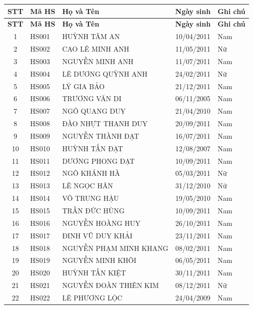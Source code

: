 \begin{longtable}{|c|l|p{6cm}|c|l|}
\hline
\textbf{STT} & \textbf{Mã HS} & \textbf{Họ và Tên} & \textbf{Ngày sinh} & \textbf{Ghi chú} \\
\hline
\endfirsthead
\hline
\textbf{STT} & \textbf{Mã HS} & \textbf{Họ và Tên} & \textbf{Ngày sinh} & \textbf{Ghi chú} \\
\hline
\endhead
1 & HS001 & HUỲNH TÂM AN & 10/04/2011 & Nam \\
\hline
2 & HS002 & CAO LÊ MINH ANH & 11/05/2011 & Nữ \\
\hline
3 & HS003 & NGUYỄN MINH ANH & 11/07/2011 & Nam \\
\hline
4 & HS004 & LÊ DƯƠNG QUỲNH ANH & 24/02/2011 & Nữ \\
\hline
5 & HS005 & LÝ GIA BẢO & 21/12/2011 & Nam \\
\hline
6 & HS006 & TRƯƠNG VĂN DI & 06/11/2005 & Nam \\
\hline
7 & HS007 & NGÔ QUANG DUY & 21/04/2010 & Nam \\
\hline
8 & HS008 & ĐÀO NHỰT THANH DUY & 20/09/2011 & Nam \\
\hline
9 & HS009 & NGUYỄN THÀNH ĐẠT & 16/07/2011 & Nam \\
\hline
10 & HS010 & HUỲNH TẤN ĐẠT & 12/08/2007 & Nam \\
\hline
11 & HS011 & DƯƠNG PHONG ĐẠT & 10/09/2011 & Nam \\
\hline
12 & HS012 & NGÔ KHÁNH HÀ & 05/03/2011 & Nữ \\
\hline
13 & HS013 & LÊ NGỌC HÂN & 31/12/2010 & Nữ \\
\hline
14 & HS014 & VÕ TRUNG HẬU & 19/05/2010 & Nam \\
\hline
15 & HS015 & TRẦN ĐỨC HÙNG & 10/09/2011 & Nam \\
\hline
16 & HS016 & NGUYỄN HOÀNG HUY & 26/10/2011 & Nam \\
\hline
17 & HS017 & ĐINH VŨ DUY KHẢI & 23/11/2011 & Nam \\
\hline
18 & HS018 & NGUYỄN PHẠM MINH KHANG & 08/02/2011 & Nam \\
\hline
19 & HS019 & NGUYỄN MINH KHÔI & 06/05/2011 & Nam \\
\hline
20 & HS020 & HUỲNH TẤN KIỆT & 30/11/2011 & Nam \\
\hline
21 & HS021 & NGUYỄN ĐOÀN THIÊN KIM & 08/12/2011 & Nữ \\
\hline
22 & HS022 & LÊ PHƯƠNG LỘC & 24/04/2009 & Nam \\

\end{longtable}
